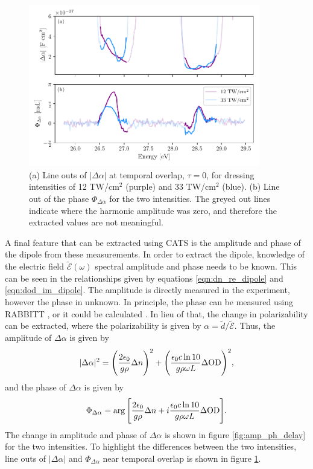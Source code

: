 \begin{figure}
	\centering
	\includegraphics[width=0.9\textwidth]{figures/CATS/amp_ph_lineout.pdf}
	\caption[Line outs of $\lvert\Delta\alpha\rvert$ and $\Phi_{\Delta\alpha}$ at $\tau=0$ using CATS]{(a) Line outs of $\lvert\Delta\alpha\rvert$ at temporal overlap, $\tau=0$, for dressing intensities of 12 TW/cm$^2$ (purple) and 33 TW/cm$^2$ (blue). (b) Line out of the phase $\Phi_{\Delta\alpha}$ for the two intensities.  The greyed out lines indicate where the harmonic amplitude was zero, and therefore the extracted values are not meaningful.}
	\label{fig:amp_ph_lineout}
\end{figure}

A final feature that can be extracted using CATS is the amplitude and phase of the dipole from these measurements.  In order to extract the dipole, knowledge of the electric field $\tilde{\mathcal{E}}(\omega)$ spectral amplitude and phase needs to be known.  This can be seen in the relationships given by equations \ref{eqn:dn_re_dipole} and \ref{eqn:dod_im_dipole}.  The amplitude is directly measured in the experiment, however the phase in unknown.  In principle, the phase can be measured using RABBITT \cite{paulObservationTrainAttosecond2001}, or it could be calculated \cite{lewensteinTheoryHighharmonicGeneration1994}.  In lieu of that, the change in polarizability can be extracted, where the polarizability is given by $\alpha=\tilde{d}/\tilde{\mathcal{E}}$.  Thus, the amplitude of $\Delta\alpha$ is given by
\begin{equation}
	\label{eqn:polariz_amp}
	\lvert\Delta\alpha\rvert^2 = \Bigg(\frac{2\epsilon_0}{g\rho}\Delta n\Bigg)^2 + \Bigg( \frac{\epsilon_0 c \ln 10}{g \rho \omega L}\Delta\mathrm{OD} \Bigg)^2,
\end{equation}
and the phase of $\Delta\alpha$ is given by
\begin{equation}
	\label{eqn:polariz_phase}
	\Phi_{\Delta\alpha}=\arg\Bigg[ \frac{2\epsilon_0}{g\rho}\Delta n  + i \frac{\epsilon_0 c \ln 10}{g \rho \omega L}\Delta\mathrm{OD}\Bigg].
\end{equation}
The change in amplitude and phase of $\Delta\alpha$ is shown in figure \ref{fig:amp_ph_delay} for the two intensities.  To highlight the differences between the two intensities, line outs of $\lvert\Delta\alpha\rvert$ and $\Phi_{\Delta\alpha}$ near temporal overlap is shown in figure \ref{fig:amp_ph_lineout}.  




